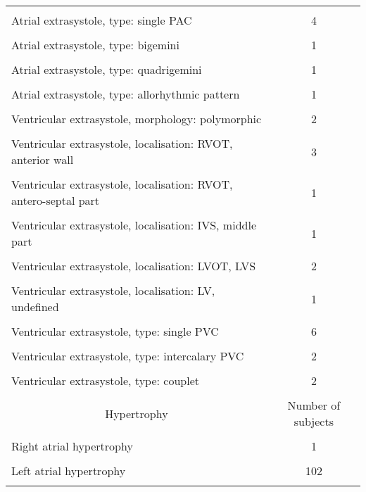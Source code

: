 \documentclass[submitted]{ieeeaccess}
\begin{document}
\begin{table}
\begin{adjustbox}{width=1\linewidth}
\begin{tabular}{|l|c|}
			\hline
			&\\[-1em]
			Atrial extrasystole, type: single PAC & 4 \\
			\hline
			&\\[-1em]
			Atrial extrasystole, type: bigemini & 1 \\
			\hline
			&\\[-1em]
			Atrial extrasystole, type: quadrigemini & 1 \\
			\hline
			&\\[-1em]
			Atrial extrasystole, type: allorhythmic pattern & 1 \\
			\hline
			&\\[-1em]
			Ventricular extrasystole, morphology: polymorphic & 2 \\
			\hline
			&\\[-1em]
			Ventricular extrasystole, localisation: RVOT, anterior wall & 3 \\
			\hline
			&\\[-1em]
			Ventricular extrasystole, localisation: RVOT, antero-septal part & 1 \\
			\hline
			&\\[-1em]
			Ventricular extrasystole, localisation: IVS, middle part & 1 \\
			\hline
			&\\[-1em]
			Ventricular extrasystole, localisation: LVOT, LVS & 2 \\
			\hline
			&\\[-1em]
			Ventricular extrasystole, localisation: LV, undefined & 1 \\
			\hline
			&\\[-1em]
			Ventricular extrasystole, type: single PVC & 6 \\
			\hline
			&\\[-1em]
			Ventricular extrasystole, type: intercalary PVC & 2 \\
			\hline
			&\\[-1em]
			Ventricular extrasystole, type: couplet & 2 \\
			\hline
			&\\[-1em]
			\multicolumn{1}{c|}{Hypertrophy} &{Number of subjects} \\
			\hline
			&\\[-1em]
			Right atrial hypertrophy & 1 \\
			\hline
			&\\[-1em]
			Left atrial hypertrophy & 102 \\
			\hline
			&\\[-1em]

\end{tabular}
\end{adjustbox}
\end{table}
\end{document}
